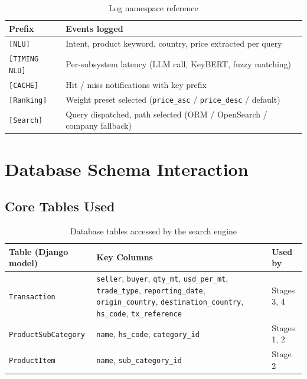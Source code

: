\documentclass[12pt,a4paper]{article}
\begin{document}
\begin{table}[H]
\centering
\renewcommand{\arraystretch}{1.3}
\begin{tabularx}{\textwidth}{lX}
\toprule
\rowcolor{tableheader!20}
\textbf{Prefix} & \textbf{Events logged} \\
\midrule
\texttt{[NLU]}        & Intent, product keyword, country, price extracted per query \\
\texttt{[TIMING NLU]} & Per-subsystem latency (LLM call, KeyBERT, fuzzy matching) \\
\texttt{[CACHE]}      & Hit / miss notifications with key prefix \\
\texttt{[Ranking]}    & Weight preset selected (\texttt{price\_asc} / \texttt{price\_desc} / default) \\
\texttt{[Search]}     & Query dispatched, path selected (ORM / OpenSearch / company fallback) \\
\bottomrule
\end{tabularx}
\caption{Log namespace reference}
\end{table}

\newpage
\section{Database Schema Interaction}
\label{sec:db}

\subsection{Core Tables Used}

\begin{table}[H]
\centering
\renewcommand{\arraystretch}{1.3}
\begin{tabularx}{\textwidth}{lXl}
\toprule
\rowcolor{tableheader!20}
\textbf{Table (Django model)} & \textbf{Key Columns} & \textbf{Used by} \\
\midrule
\texttt{Transaction} &
  \texttt{seller}, \texttt{buyer}, \texttt{qty\_mt}, \texttt{usd\_per\_mt},
  \texttt{trade\_type}, \texttt{reporting\_date}, \texttt{origin\_country},
  \texttt{destination\_country}, \texttt{hs\_code}, \texttt{tx\_reference} &
  Stages 3, 4 \\[4pt]
\texttt{ProductSubCategory} &
  \texttt{name}, \texttt{hs\_code}, \texttt{category\_id} &
  Stages 1, 2 \\[4pt]
\texttt{ProductItem} &
  \texttt{name}, \texttt{sub\_category\_id} &
  Stage 2 \\
\bottomrule
\end{tabularx}
\caption{Database tables accessed by the search engine}
\end{table}
\end{document}
